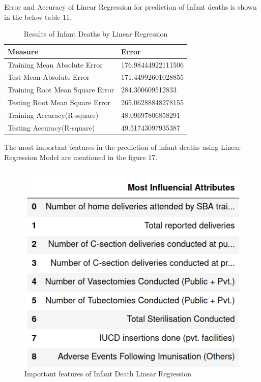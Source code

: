 \documentclass[12pt]{article}
\begin{document}
Error and Accuracy of Linear Regression for prediction of Infant deaths is shown in the below table 11. 

\begin{table}[h]
\centering
\caption{Results of Infant Deaths by Linear Regression}
\vspace{5pt}
\begin{tabular}{|l|l|}
\hline
\textbf{Measure}                & \textbf{Error}     \\ \hline
Training Mean Absolute Error    & 176.98444922111506 \\
Test Mean Absolute Error        & 171.44992601028855 \\
Training Root Mean Square Error & 284.300609512833   \\
Testing Root Mean Square Error  & 265.06288848278155 \\
Training Accuracy(R-square)     & 48.09697806858291  \\
Testing Accuracy(R-square)      & 49.51743097935387 \\ \hline
\end{tabular}
\end{table}
The most important features in the prediction of infant deaths using Linear Regression Model are mentioned in the figure 17.
\begin{figure}[h]
\centering
\includegraphics[scale=.5]{images/features-of-infant-death-linear-regression .png}
\caption{Important features of Infant Death Linear Regression}
\end{figure}
\end{document}
